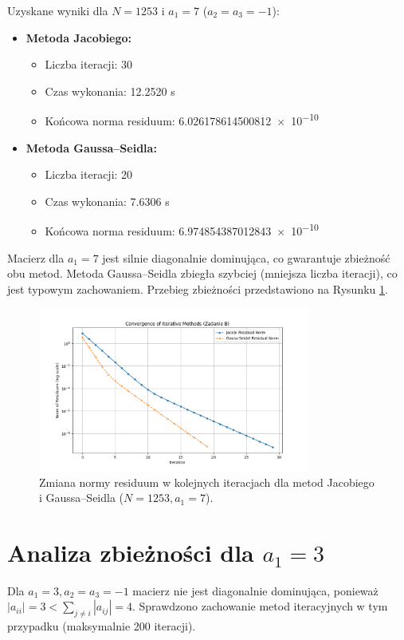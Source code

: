 \documentclass[a4paper, 11pt]{article}
\begin{document}
Uzyskane wyniki dla $N=1253$ i $a_1=7$ ($a_2=a_3=-1$):
\begin{itemize}
    \item \textbf{Metoda Jacobiego:}
    \begin{itemize}
        \item Liczba iteracji: 30
        \item Czas wykonania: \num{12.2520} s
        \item Końcowa norma residuum: \num{6.026178614500812e-10}
    \end{itemize}
    \item \textbf{Metoda Gaussa–Seidla:}
    \begin{itemize}
        \item Liczba iteracji: 20
        \item Czas wykonania: \num{7.6306} s
        \item Końcowa norma residuum: \num{6.974854387012843e-10}
    \end{itemize}
\end{itemize}
Macierz dla $a_1=7$ jest silnie diagonalnie dominująca, co gwarantuje zbieżność obu metod. Metoda Gaussa–Seidla zbiegła szybciej (mniejsza liczba iteracji), co jest typowym zachowaniem. Przebieg zbieżności przedstawiono na Rysunku \ref{fig:task_b_convergence}.

\begin{figure}[H]
    \centering
    \includegraphics[width=0.8\textwidth]{residuals_plot_B}
    \caption{Zmiana normy residuum w kolejnych iteracjach dla metod Jacobiego i Gaussa–Seidla ($N=1253, a_1=7$).}
    \label{fig:task_b_convergence}
\end{figure}

\section{Analiza zbieżności dla $a_1 = 3$}
Dla $a_1=3, a_2=a_3=-1$ macierz nie jest diagonalnie dominująca, ponieważ $|a_{ii}| = 3 < \sum_{j\neq i} |a_{ij}| = 4$. Sprawdzono zachowanie metod iteracyjnych w tym przypadku (maksymalnie 200 iteracji).
\end{document}
